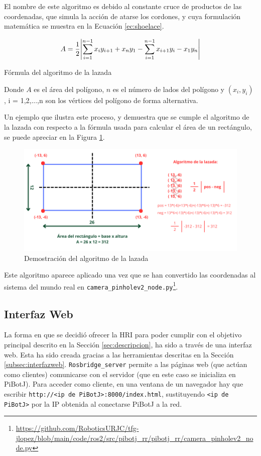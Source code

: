 El nombre de este algoritmo es debido al constante cruce de productos de las coordenadas, que simula la acción de atarse los cordones, y cuya formulación matemática se muestra en la Ecuación \ref{ec:shoelace}.
\begin{myequation}[h]
	\begin{equation}
		A = \frac{1}{2}\abs{\sum_{i=1}^{n-1}x_i y_{i+1} + x_n y_1 - \sum_{i=1}^{n-1}x_{i+1} y_{i} - x_1 y_n}
		\nonumber
	\end{equation}
	\caption[Fórmula del algoritmo de la lazada]{Fórmula del algoritmo de la lazada}
	\label{ec:shoelace}
\end{myequation} 

Donde $A$ es el área del polígono, $n$ es el número de lados del polígono y $(x_i, y_i)$ , i = 1,2,...,n son los vértices del polígono de forma alternativa.

Un ejemplo que ilustra este proceso, y demuestra que se cumple el algoritmo de la lazada con respecto a la fórmula usada para calcular el área de un rectángulo, se puede apreciar en la Figura \ref{fig:demoshoelace}.

 \begin{figure} [h!]
	\begin{center}
		\includegraphics[width=15cm]{figs/cap6/demoshoelace.png}
	\end{center}
	\caption{Demostración del algoritmo de la lazada}
	\label{fig:demoshoelace}
\end{figure}


Este algoritmo aparece aplicado una vez que se han convertido las coordenadas al sistema del mundo real en \verb|camera_pinholev2_node.py|\footnote{\url{https://github.com/RoboticsURJC/tfg-jlopez/blob/main/code/ros2/src/pibotj_rr/pibotj_rr/camera_pinholev2_node.py}}.


\subsection{Interfaz Web}
\label{subsec:softwareweb}
La forma en que se decidió ofrecer la \ac{HRI} para poder cumplir con el objetivo principal descrito en la Sección \ref{sec:descripcion}, ha sido a través de una interfaz web. Esta ha sido creada gracias a las herramientas descritas en la Sección \ref{subsec:interfazweb}. \verb|Rosbridge_server| permite a las páginas web (que actúan como clientes) comunicarse con el servidor (que en este caso se inicializa en PiBotJ). Para acceder como cliente, en una ventana de un navegador hay que escribir \verb|http://<ip de PiBotJ>:8000/index.html|, sustituyendo \verb|<ip de PiBotJ>| por la IP obtenida al conectarse PiBotJ a la red.
 
